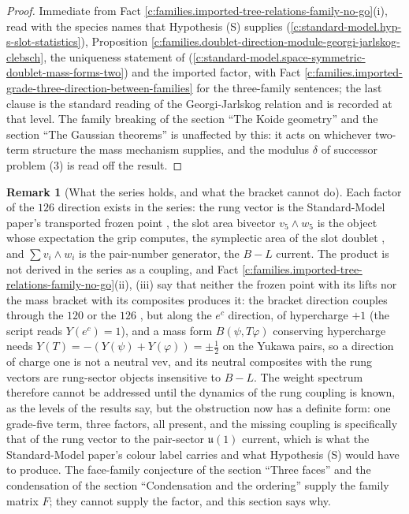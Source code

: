 \documentclass[11pt]{article}
\theoremstyle{definition}
\newtheorem{remark}[theorem]{Remark}
\theoremstyle{plain}
\providecommand{\uu}{}\renewcommand{\uu}{\mathfrak{u}}
\begin{document}
\begin{proof}
Immediate from Fact \ref{c:families.imported-tree-relations-family-no-go}(i), read with the species names that Hypothesis (S) supplies (\ref{c:standard-model.hyp-s-slot-statistics}), Proposition \ref{c:families.doublet-direction-module-georgi-jarlskog-clebsch}, the uniqueness statement of \cite[Prop.~9.32]{ButlerT12} (\ref{c:standard-model.space-symmetric-doublet-mass-forms-two}) and the imported factor, with Fact \ref{c:families.imported-grade-three-direction-between-families} for the three-family sentences; the last clause is the standard reading of the Georgi-Jarlskog relation and is recorded at that level. The family breaking of the section ``The Koide geometry'' and the section ``The Gaussian theorems'' is unaffected by this: it acts on whichever two-term structure the mass mechanism supplies, and the modulus $\delta$ of successor problem (3) is read off the result.

\end{proof}

\begin{remark}[What the series holds, and what the bracket cannot do]\label{c:note.families.what-series-holds-what-bracket-cannot}
Each factor of the $126$ direction exists in the series: the rung vector is the Standard-Model paper's transported frozen point \cite[Prop.~9.27]{ButlerT12}, the slot area bivector $v_{5}\wedge w_{5}$ is the object whose expectation the grip computes, the symplectic area of the slot doublet \cite[Thm.~9.11]{ButlerT12}, and $\sum v_{i}\wedge w_{i}$ is the pair-number generator, the $B - L$ current. The product is not derived in the series as a coupling, and Fact \ref{c:families.imported-tree-relations-family-no-go}(ii), (iii) say that neither the frozen point with its lifts nor the mass bracket with its composites produces it: the bracket direction couples through the $120$ or the $126$ \cite[Prop.~9.15(b)]{ButlerT12}, but along the $e^{c}$ direction, of hypercharge $+1$ (the script reads $Y(e^{c}) = 1$), and a mass form $B(\psi, T\varphi)$ conserving hypercharge needs $Y(T) = -(Y(\psi) + Y(\varphi)) = \pm\tfrac12$ on the Yukawa pairs, so a direction of charge one is not a neutral vev, and its neutral composites with the rung vectors are rung-sector objects insensitive to $B - L$. The weight spectrum therefore cannot be addressed until the dynamics of the rung coupling is known, as the levels of the results say, but the obstruction now has a definite form: one grade-five term, three factors, all present, and the missing coupling is specifically that of the rung vector to the pair-sector $\uu(1)$ current, which is what the Standard-Model paper's colour label carries and what Hypothesis (S) would have to produce. The face-family conjecture of the section ``Three faces'' and the condensation of the section ``Condensation and the ordering'' supply the family matrix $F$; they cannot supply the factor, and this section says why.
\end{remark}
\end{document}
